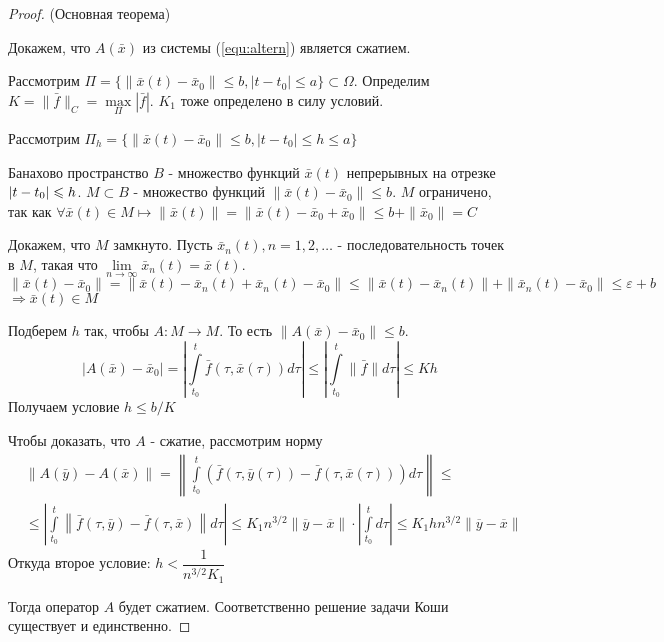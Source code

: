 \begin{proof}
    (Основная теорема)
    
    Докажем, что $A(\bar{x})$ из системы (\ref{equ:altern}) является сжатием.
    
    Рассмотрим $\Pi = \{\|\bar{x}(t) - \bar{x}_0\| \leqslant b, |t-t_0| \leqslant a   \} \subset \Omega$. Определим $K = \|\bar{f}\|_C = \max\limits_{\Pi}|\bar{f}|$. $K_1$ тоже определено в силу условий.
    
    Рассмотрим $\Pi_h = \{\|\bar{x}(t) - \bar{x}_0\| \leqslant b, |t-t_0| \leqslant h \leqslant a   \}$
    
    Банахово пространство $B$ - множество функций $\bar{x}(t)$ непрерывных на отрезке $|t-t_0|\hm\leqslant h$. $M \subset B$ - множество функций $\|\bar{x}(t) - \bar{x}_0\| \leqslant b$. $M$ ограничено, так как $\forall \bar{x}(t) \in M \longmapsto \|\bar{x}(t)\| = \|\bar{x}(t) - \bar{x}_0 + \bar{x}_0\| \leqslant b + \|\bar{x}_0\| = C$
    
    Докажем, что $M$ замкнуто. Пусть $\bar{x}_n(t), n = 1, 2, \dots$ - последовательность точек в $M$, такая что $\lim\limits_{n\to \infty} \bar{x}_n(t) = \bar{x}(t)$. $\|\bar{x}(t) - \bar{x}_0\| = \|\bar{x}(t) - \bar{x}_n(t) + \bar{x}_n(t) - \bar{x}_0\| \leqslant \|\bar{x}(t) - \bar{x}_n(t)\| + \|\bar{x}_n(t) - \bar{x}_0\| \leqslant \varepsilon + b$ $\Rightarrow \bar{x}(t) \in M$
    
    Подберем $h$ так, чтобы $A:M\to M$. То есть $\|A(\bar{x}) - \bar{x}_0\| \leqslant b$.
    \[
        \left|A(\bar{x}) - \bar{x}_0\right| = \left|\int\limits_{t_0}^t \bar{f}(\tau, \bar{x}(\tau))d\tau\right| \leqslant \left|\int\limits_{t_0}^t \|\bar{f}\|d\tau \right| \leqslant Kh
    \]
    Получаем условие $h\leqslant b/K$
    
    Чтобы доказать, что $A$ - сжатие, рассмотрим норму
    \begin{align*}
        &\|A(\bar{y}) - A(\bar{x})\| = \left\|
        \int\limits_{t_0}^t(\bar{f}(\tau, \bar{y}(\tau)) - \bar{f}(\tau, \bar{x}(\tau)))d\tau \right\| \leqslant \\ &\leqslant  \left| \int\limits_{t_0}^t \left\| \bar{f}(\tau, \bar{y}) - \bar{f}(\tau, \bar{x}) \right\| d\tau\right| \leqslant K_1n^{3/2}\|\overline{y} - \overline{x}\|\cdot \left|\int\limits_{t_0}^td\tau\right| \leqslant K_1hn^{3/2}\|\overline{y} - \overline{x}\|
    \end{align*}
    Откуда второе условие: $h < \dfrac{1}{n^{3/2}K_1}$
    
    Тогда оператор $A$ будет сжатием. Соответственно решение задачи Коши существует и единственно.
    
\end{proof}

